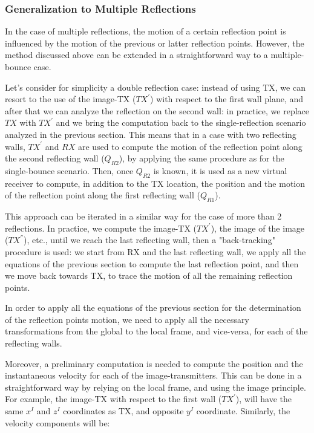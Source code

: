 \subsubsection{Generalization to Multiple Reflections}
In the case of multiple reflections, the motion of a certain reflection point is influenced by the motion of the previous or latter reflection points.  
However, the method discussed above can be extended in a straightforward way to a multiple-bounce case. 

Let's consider for simplicity a double reflection case: instead of using TX, we can resort to the use of the image-TX ($TX^{'}$) with respect to the first wall plane, and after that we can analyze the reflection on the second wall: in practice, we replace $TX$ with $TX^{'}$ and we bring the computation back to the single-reflection scenario analyzed in the previous section. This means that in a case with two reflecting walls, $TX^{'}$ and $RX$ are used to compute the motion of the reflection point along the second reflecting wall ($Q_{R2}$), by applying the same procedure as for the single-bounce scenario. Then, once $Q_{R2}$ is known, it is used as a new virtual receiver to compute, in addition to the TX location, the position and the motion of the reflection point along the first reflecting wall ($Q_{R1}$). 

This approach can be iterated in a similar way for the case of more than 2 reflections. In practice, we compute the image-TX ($TX^{'}$), the image of the image ($TX^{''}$), etc., until we reach the last reflecting wall, then a "back-tracking" procedure is used: we start from RX and the last reflecting wall, we apply all the equations of the previous section to compute the last reflection point, and then we move back towards TX, to trace the motion of all the remaining reflection points.  

In order to apply all the equations of the previous section for the determination of the reflection points motion, we need to apply all the necessary transformations from the global to the local frame, and vice-versa, for each of the reflecting walls.

Moreover, a preliminary computation is needed to compute the position and the instantaneous velocity for each of the image-transmitters. This can be done in a straightforward way by relying on the local frame, and using the image principle. For example, the image-TX with respect to the first wall ($TX^{'}$), will have the same $x^I$ and $z^I$ coordinates as TX, and opposite $y^I$ coordinate. Similarly, the velocity components will be:

